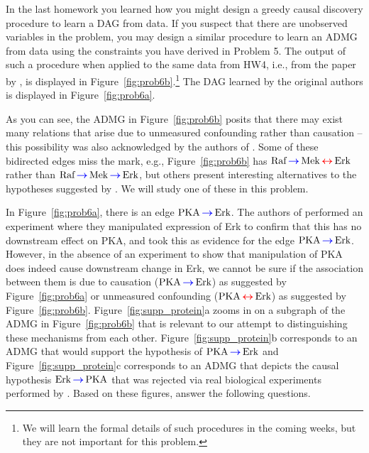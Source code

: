 \documentclass[letterpaper, 11pt]{article}
\DeclareMathOperator{\diedgeright}{\textcolor{blue}{\boldsymbol{\rightarrow}}}
\DeclareMathOperator{\biedge}{\textcolor{red}{\boldsymbol{\leftrightarrow}}}
\begin{document}
In the last homework you learned how you might design a greedy causal discovery procedure to learn a DAG from data. If you suspect that there are unobserved variables in the problem, you may design a similar  procedure to learn an ADMG from data using the constraints you have derived in Problem 5. The output of such a procedure when applied to the same data from HW4, i.e., from the paper by \cite{sachs2005causal}, is displayed in Figure~\ref{fig:prob6b}.\footnote{We will learn the formal details of such procedures in the coming weeks, but they are not important for this problem.} The DAG learned by the original authors is displayed in Figure~\ref{fig:prob6a}.

As you can see, the ADMG in Figure~\ref{fig:prob6b} posits that there may exist many relations that arise due to unmeasured confounding rather than causation -- this possibility was also acknowledged by the authors of \cite{sachs2005causal}. Some of these bidirected edges miss the mark, e.g., Figure~\ref{fig:prob6b} has $\text{Raf} \diedgeright \text{Mek} \biedge \text{Erk}$ rather than $\text{Raf} \diedgeright \text{Mek} \diedgeright \text{Erk}$, but others present interesting alternatives to the hypotheses suggested by \cite{sachs2005causal}. We will study one of these in this problem.

In Figure~\ref{fig:prob6a}, there is an edge $\text{PKA} \diedgeright \text{Erk}$. The authors of \cite{sachs2005causal} performed an experiment where they manipulated expression of Erk to confirm that this has no downstream effect on PKA, and took this as evidence for the edge $\text{PKA} \diedgeright \text{Erk}$. However, in the absence of an experiment to show that manipulation of PKA does indeed cause downstream change in Erk, we cannot be sure if the association between them is due to causation ($\text{PKA} \diedgeright \text{Erk}$) as suggested by Figure~\ref{fig:prob6a} or unmeasured confounding ($\text{PKA} \biedge \text{Erk}$) as suggested by Figure~\ref{fig:prob6b}. Figure~\ref{fig:supp_protein}a zooms in on a subgraph of the ADMG in Figure~\ref{fig:prob6b} that is relevant to our attempt to distinguishing these mechanisms from each other. Figure~\ref{fig:supp_protein}b corresponds to an ADMG that would support the \cite{sachs2005causal} hypothesis of $\text{PKA} \diedgeright \text{Erk}$ and Figure~\ref{fig:supp_protein}c corresponds to an ADMG that depicts the causal hypothesis $\text{Erk} \diedgeright \text{PKA}$ that was rejected via real biological experiments performed by \cite{sachs2005causal}. Based on these figures, answer the following questions.
\end{document}
